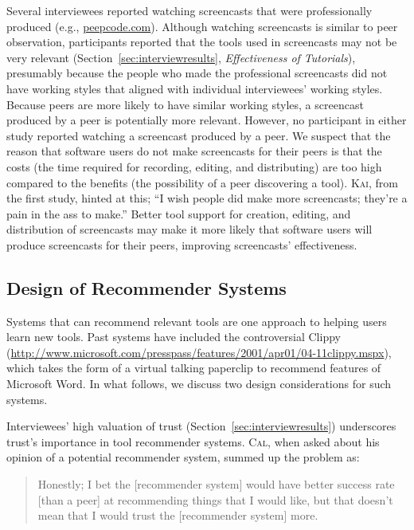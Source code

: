\documentclass[smallextended]{svjour3}
\newcommand\discpull{peer observation\xspace}
\newcommand{\subject}[1]{\textsc{#1}}
\newcommand{\ksub}{{\subject{Cal}}\xspace}
\newcommand{\lsub}{{\subject{Kai}}\xspace}
\begin{document}
Several interviewees reported watching screencasts that were professionally
produced (e.g., \url{peepcode.com}).
Although watching screencasts is similar to \discpull, participants reported
that the tools used in screencasts may not be very relevant 
(Section~\ref{sec:interviewresults}, \textit{Effectiveness of Tutorials}), 
presumably because
the people who made the professional screencasts did not have working
styles that aligned with individual interviewees' working styles.
Because peers are more likely to have similar working styles, a
screencast produced by a peer is potentially more relevant.
However, no participant in either study reported watching a screencast produced by a peer.
We suspect that the reason that software users do not make screencasts for their
peers is that the costs (the time required for recording, editing, and distributing) are
too high compared to the benefits (the possibility of a peer discovering a
tool).
\lsub, from the first study, hinted at this; ``I wish people did make more screencasts; they're a
pain in the ass to make.''
Better tool support for creation, editing, and distribution of screencasts may
make it more likely that software users will produce screencasts for their peers,
improving screencasts' effectiveness.

\subsection{Design of Recommender Systems}

\noindent
Systems that can recommend relevant tools are one approach to helping users
learn new tools.
Past systems have included the controversial Clippy 
(\url{http://www.microsoft.com/presspass/features/2001/apr01/04-11clippy.mspx}),
which takes the form of a virtual talking paperclip to recommend features of
Microsoft Word.
In what follows, we discuss two design considerations for such systems.

 Interviewees' high valuation of trust (Section~\ref{sec:interviewresults})
underscores trust's importance in tool recommender systems. 
\ksub, when asked about his opinion of a potential recommender system, summed up
the problem as:


\begin{quote}
Honestly; I bet the [recommender system] would have better success rate [than
a peer] at recommending things that I would like, but that doesn't mean that I
would trust the [recommender system] more.
\end{quote}
\end{document}
